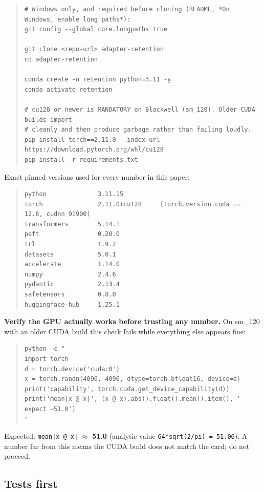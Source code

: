 \begin{quote}\tiny\begin{verbatim}
# Windows only, and required before cloning (README, *On Windows, enable long paths*):
git config --global core.longpaths true

git clone <repo-url> adapter-retention
cd adapter-retention

conda create -n retention python=3.11 -y
conda activate retention

# cu128 or newer is MANDATORY on Blackwell (sm_120). Older CUDA builds import
# cleanly and then produce garbage rather than failing loudly.
pip install torch==2.11.0 --index-url https://download.pytorch.org/whl/cu128
pip install -r requirements.txt
\end{verbatim}\end{quote}

Exact pinned versions used for every number in this paper:

\begin{quote}\tiny\begin{verbatim}
python              3.11.15
torch               2.11.0+cu128     (torch.version.cuda == 12.8, cudnn 91900)
transformers        5.14.1
peft                0.20.0
trl                 1.9.2
datasets            5.0.1
accelerate          1.14.0
numpy               2.4.6
pydantic            2.13.4
safetensors         0.8.0
huggingface-hub     1.25.1
\end{verbatim}\end{quote}

\textbf{Verify the GPU actually works before trusting any number.} On sm\_120 with an older CUDA build this check fails while everything else appears fine:

\begin{quote}\tiny\begin{verbatim}
python -c "
import torch
d = torch.device('cuda:0')
x = torch.randn(4096, 4096, dtype=torch.bfloat16, device=d)
print('capability', torch.cuda.get_device_capability(d))
print('mean|x @ x|', (x @ x).abs().float().mean().item(), '  expect ~51.0')
"
\end{verbatim}\end{quote}

Expected: \texttt{mean|x @ x|} $\approx$ \textbf{51.0} (analytic value \texttt{64*sqrt(2/\allowbreak{}pi) = 51.\allowbreak{}06}). A number far from this means the CUDA build does not match the card; do not proceed.

\subsection{Tests first}

